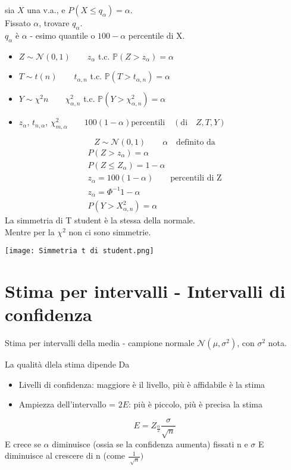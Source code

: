 sia $X$ una v.a., e  $P(X\leq q_\alpha) = \alpha$.
\\Fissato $\alpha$, trovare $q_\alpha$.
\\ $q_\alpha$ è $\alpha$ - esimo quantile o $100 - \alpha$ percentile di X.
\begin{itemize}
    \item $Z \sim \mathcal{N}(0,1) \qquad z_\alpha$ t.c. $\mathbb{P}(Z>z_\alpha) = \alpha$
    \item $T \sim t(n) \qquad t_{\alpha, n}$ t.c. $\mathbb{P}(T>t_{\alpha, n}) = \alpha$
    \item $Y \sim \chi^2{n} \qquad \chi^2_{\alpha, n}$ t.c. $\mathbb{P}(Y>\chi^2_{\alpha,n}) = \alpha$
    \item $z_\alpha$, $t_{n, \alpha}$, $\chi^2_{m, \alpha} 
    \qquad 100(1-\alpha) \text{percentili} \quad (\text{di}\quad Z, T, Y)$
\end{itemize}
\begin{equation*}
    Z \sim \mathcal{N}(0,1) \qquad \alpha \quad \text{definito da}
\end{equation*}
\begin{gather*}
    P(Z>z_\alpha) = \alpha \\
    P(Z\leq Z_\alpha) = 1-\alpha \\
    z_\alpha = 100(1-\alpha) \qquad \text{percentili di Z}\\
    z_\alpha = \Phi^{-1}{1-\alpha} \\
    P(Y > X^2_{\alpha, n}) = \alpha
\end{gather*}
La simmetria di T student è la stessa della normale.
\\ Mentre per la $\chi^2$ non ci sono simmetrie.
\begin{center}
    \texttt{[image: Simmetria t di student.png]}
\end{center}

\section{Stima per intervalli - Intervalli di confidenza}
Stima per intervalli della media - campione normale $\mathcal{N}(\mu, \sigma^2)$, con
$\sigma^2$ nota.

La qualità dlela stima dipende Da
\begin{itemize}
    \item Livelli di confidenza: maggiore è il livello, più è affidabile è la stima
    \item Ampiezza dell'intervallo = $2E$: più è piccolo, più è precisa la stima
\end{itemize}
\begin{equation*}
    E=Z_{\frac{\alpha}{2}}\frac{\sigma}{\sqrt{n}}
\end{equation*}
E crece se $\alpha$ diminuisce (ossia se la confidenza aumenta) fissati n e $\sigma$
E diminuisce al crescere di n (come $\frac{1}{\sqrt[]{n}})$
